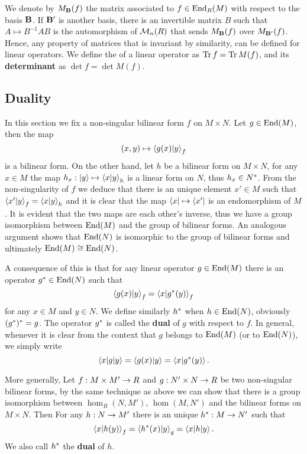 We denote by $M_{\mathbf{B}}(f)$ the matrix associated to
$f\in\operatorname{End}_R(M)$ with respect to the basis $\mathbf{B}$.  If
$\mathbf{B'}$ is another basis, there is an invertible matrix $B$ such
that $A\mapsto B^{-1}AB$ is the automorphism of $\operatorname{\mathcal{M}}_n(R)$ that sends
$M_{\mathbf{B}}(f)$ over $M_{\mathbf{B'}}(f)$. Hence, any property of
matrices that is invariant by similarity, can be defined for linear
operators. We define the 
 of a linear operator as $\operatorname{Tr} f = \operatorname{Tr} M(f)$, and
its \textbf{determinant} as $\det f = \det M(f)$.


\subsection{Duality}
\label{sec:linear-algebra:duality}
In this section we fix a non-singular bilinear form $f$ on $M\times
N$. Let $g\in\operatorname{End}(M)$, then the map
\[(x,y) \mapsto \left\langle g(x) \middle| y \right\rangle_f\] is a bilinear
form. On the other hand, let $h$ be a bilinear form on $M\times N$,
for any $x\in M$ the map $h_x : \left\lvert y \right\rangle \mapsto \left\langle x \middle| y \right\rangle_h$
is a linear form on $N$, thus $h_x\in N^\ast$. From the
non-singularity of $f$ we deduce that there is an unique element
$x'\in M$ such that $\left\langle x' \middle| y \right\rangle_f=\left\langle x \middle| y \right\rangle_h$ and it is
clear that the map $\left\langle x \right\rvert\mapsto \left\langle x' \right\rvert$ is an endomorphism of
$M$. It is evident that the two maps are each other's inverse, thus we
have a group isomorphism between $\operatorname{End}(M)$ and the group of bilinear
forms. An analogous argument shows that $\operatorname{End}(N)$ is isomorphic to the
group of bilinear forms and ultimately $\operatorname{End}(M)\cong\operatorname{End}(N)$.

A consequence of this is that for any linear operator $g\in\operatorname{End}(M)$
there is an operator $g^\ast\in\operatorname{End}(N)$ such that
\[\left\langle g(x) \middle| y \right\rangle_f = \left\langle x \middle| g^\ast(y) \right\rangle_f\]
for any $x\in M$ and $y\in N$. We define similarly $h^\ast$ when
$h\in\operatorname{End}(N)$, obviously $(g^\ast)^\ast = g$. The operator
$g^\ast$ is called the \textbf{dual} of $g$
with respect to $f$. In general, whenever it is clear from the context
that $g$ belongs to $\operatorname{End}(M)$ (or to $\operatorname{End}(N)$), we simply write
\[\left\langle x \middle| g \middle| y \right\rangle = \left\langle g(x) \middle| y \right\rangle = \left\langle x \middle| g^\ast(y) \right\rangle\text{.}\]

More generally, Let $f:M\times M'\rightarrow R$ and $g:N'\times N\rightarrow R$ be two
non-singular bilinear forms, by the same technique as above we can
show that there is a group isomorphism between $\hom_R(N,M')$,
$\hom(M,N')$ and the bilinear forms on $M\times N$. Then For any
$h:N\rightarrow M'$ there is an unique $h^\ast:M\rightarrow N'$ such that
\[\left\langle x \middle| h(y) \right\rangle_f = \left\langle h^\ast(x) \middle| y \right\rangle_g =
\left\langle x \middle| h \middle| y \right\rangle\text{.}\]
We also call $h^\ast$ the \textbf{dual} of $h$.

